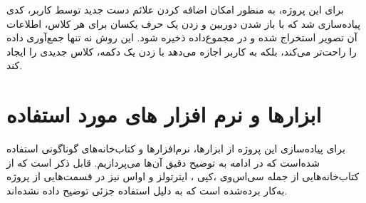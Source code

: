برای این پروژه، به منظور امکان اضافه کردن علائم دست جدید توسط کاربر، کدی پیاده‌سازی شد که با باز شدن دوربین و زدن یک حرف  یکسان برای هر کلاس، اطلاعات آن تصویر استخراج شده و در مجموع‌داده ذخیره شود. این روش نه تنها جمع‌آوری داده را راحت‌تر می‌کند، بلکه به کاربر اجازه می‌دهد با زدن یک دکمه، کلاس جدیدی را ایجاد کند.



\section{ابزار‌ها و نرم افزار های مورد استفاده}
برای پیاده‌سازی این پروژه از ابزار‌ها، نرم‌افزار‌ها و کتاب‌خانه‌های گوناگونی استفاده شده‌است که در ادامه به توضیح دقیق آن‌ها می‌پردازیم. قابل ذکر است که از کتاب‌خانه‌هایی از جمله سی‌اس‌وی ،کپی ، ایترتولز و اواس نیز در قسمت‌هایی از پروژه به‌کار برده‌شده است که به دلیل استفاده جزئی توضیح داده نشده‌اند.


